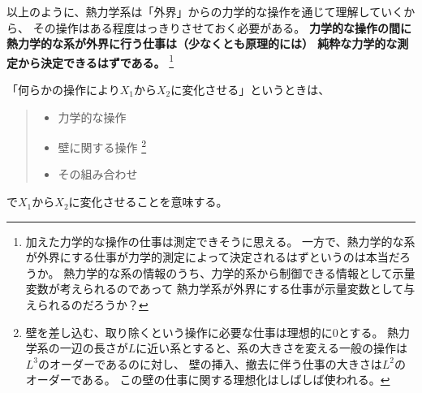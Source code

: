 以上のように、熱力学系は「外界」からの力学的な操作を通じて理解していくから、
その操作はある程度はっきりさせておく必要がある。
\textbf{
  力学的な操作の間に熱力学的な系が外界に行う仕事は（少なくとも原理的には）
  純粋な力学的な測定から決定できるはずである。
}
\footnote{
  加えた力学的な操作の仕事は測定できそうに思える。
  一方で、熱力学的な系が外界にする仕事が力学的測定によって決定されるはずというのは本当だろうか。
  熱力学的な系の情報のうち、力学的系から制御できる情報として示量変数が考えられるのであって
  熱力学系が外界にする仕事が示量変数として与えられるのだろうか？
}

「何らかの操作により$X_1$から$X_2$に変化させる」というときは、
\begin{quote}
  \begin{itemize}
    \item 力学的な操作
    \item 壁に関する操作
    \footnote{
      壁を差し込む、取り除くという操作に必要な仕事は理想的に0とする。
      熱力学系の一辺の長さが$L$に近い系とすると、系の大きさを変える一般の操作は$L^3$のオーダーであるのに対し、
      壁の挿入、撤去に伴う仕事の大きさは$L^2$のオーダーである。
      この壁の仕事に関する理想化はしばしば使われる。
    }
    \item その組み合わせ
  \end{itemize}
\end{quote}
で$X_1$から$X_2$に変化させることを意味する。